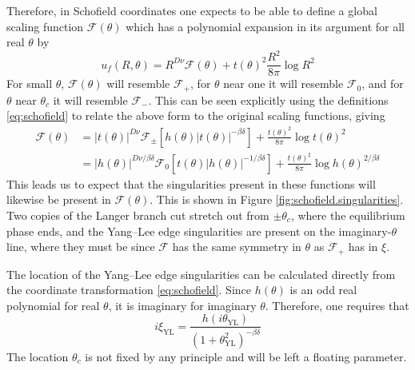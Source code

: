 \documentclass[
  aps,
  pre,
  preprint,
  longbibliography,
  floatfix
]{revtex4-2}
\begin{document}
Therefore, in Schofield coordinates one expects to be able to define a global
scaling function $\mathcal F(\theta)$ which has a polynomial expansion in its
argument for all real $\theta$ by
\begin{equation}
  u_f(R,\theta)=R^{D\nu}\mathcal F(\theta)+t(\theta)^2\frac{R^2}{8\pi}\log R^2
\end{equation}
For small $\theta$, $\mathcal F(\theta)$ will
resemble $\mathcal F_+$, for $\theta$ near one it will resemble $\mathcal F_0$,
and for $\theta$ near $\theta_c$ it will resemble $\mathcal F_-$. This can be seen explicitly using the definitions \eqref{eq:schofield} to relate the above form to the original scaling functions, giving
\begin{equation} \label{eq:scaling.function.equivalences.2d}
  \begin{aligned}
    \mathcal F(\theta)
    &=|t(\theta)|^{D\nu}\mathcal F_\pm\left[h(\theta)|t(\theta)|^{-\beta\delta}\right]
    +\frac{t(\theta)^2}{8\pi}\log t(\theta)^2\\
    &=|h(\theta)|^{D\nu/\beta\delta}\mathcal F_0\left[t(\theta)|h(\theta)|^{-1/\beta\delta}\right]
    +\frac{t(\theta)^2}{8\pi}\log h(\theta)^{2/\beta\delta}
  \end{aligned}
\end{equation}
This leads us
to expect that the singularities present in these functions will likewise be
present in $\mathcal F(\theta)$. This is shown in Figure
\ref{fig:schofield.singularities}. Two copies of the Langer branch cut stretch
out from $\pm\theta_c$, where the equilibrium phase ends, and the Yang--Lee
edge singularities are present on the imaginary-$\theta$ line, where they must be since $\mathcal F$ has the same symmetry in $\theta$ as $\mathcal F_+$ has in $\xi$.

The location of the Yang--Lee edge singularities can be calculated directly from the coordinate transformation \eqref{eq:schofield}. Since $h(\theta)$ is an odd real polynomial for real $\theta$, it is imaginary for imaginary $\theta$. Therefore, one requires that
\begin{equation}
  i\xi_{\mathrm{YL}}=\frac{h(i\theta_{\mathrm{YL}})}{(1+\theta_{\mathrm{YL}}^2)^{-\beta\delta}}
\end{equation}
The location $\theta_c$ is not fixed by any principle and will be left a floating parameter.
\end{document}
